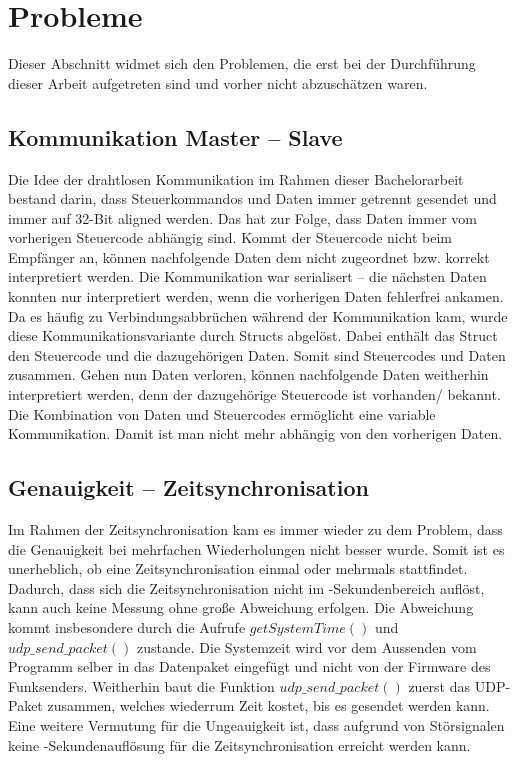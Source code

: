 \newpage
\section{Probleme}
Dieser Abschnitt widmet sich den Problemen, die erst bei der Durchführung dieser Arbeit aufgetreten sind und vorher nicht abzuschätzen waren.

\subsection{Kommunikation Master -- Slave}
Die Idee der drahtlosen Kommunikation im Rahmen dieser Bachelorarbeit bestand darin, dass Steuerkommandos und Daten immer getrennt gesendet und immer auf 32-Bit aligned werden. Das hat zur Folge, dass Daten immer vom vorherigen Steuercode abhängig sind. Kommt der Steuercode nicht beim Empfänger an, können nachfolgende Daten dem nicht zugeordnet bzw. korrekt interpretiert werden. Die Kommunikation war serialisert -- die nächsten Daten konnten nur interpretiert werden, wenn die vorherigen Daten fehlerfrei ankamen. Da es häufig zu Verbindungsabbrüchen während der Kommunikation kam, wurde diese Kommunikationsvariante durch Structs abgelöst. Dabei enthält das Struct den Steuercode und die dazugehörigen Daten. Somit sind Steuercodes und Daten zusammen. Gehen nun Daten verloren, können nachfolgende Daten weitherhin interpretiert werden, denn der dazugehörige Steuercode ist vorhanden/ bekannt. Die Kombination von Daten und Steuercodes ermöglicht eine variable Kommunikation. Damit ist man nicht mehr abhängig von den vorherigen Daten.

\subsection{Genauigkeit -- Zeitsynchronisation}
Im Rahmen der Zeitsynchronisation kam es immer wieder zu dem Problem, dass die Genauigkeit bei mehrfachen Wiederholungen nicht besser wurde. Somit ist es unerheblich, ob eine Zeitsynchronisation einmal oder mehrmals stattfindet. Dadurch, dass sich die Zeitsynchronisation nicht im \si{\mu}-Sekundenbereich auflöst, kann auch keine Messung ohne große Abweichung erfolgen. Die Abweichung kommt insbesondere durch die Aufrufe $getSystemTime()$ und $udp\_send\_packet()$ zustande. Die Systemzeit wird vor dem Aussenden vom Programm selber in das Datenpaket eingefügt und nicht von der Firmware des Funksenders. Weitherhin baut die Funktion $udp\_send\_packet()$ zuerst das UDP-Paket zusammen, welches wiederrum Zeit kostet, bis es gesendet werden kann. Eine weitere Vermutung für die Ungeauigkeit ist, dass aufgrund von Störsignalen keine \si{\mu}-Sekundenauflösung für die Zeitsynchronisation erreicht werden kann.

